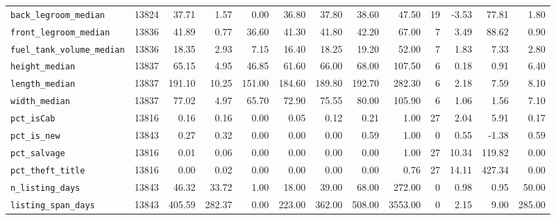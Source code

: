 \begin{table}[htbp]
\begin{tabular}{lrrrrrrrrrrrr}
    \texttt{back\_legroom\_median} & 13824 & 37.71 & 1.57 & 0.00 & 36.80 & 37.80 & 38.60 & 47.50 & 19 & -3.53 & 77.81 & 1.80 \\
    \texttt{front\_legroom\_median} & 13836 & 41.89 & 0.77 & 36.60 & 41.30 & 41.80 & 42.20 & 67.00 & 7 & 3.49 & 88.62 & 0.90 \\
    \texttt{fuel\_tank\_volume\_median} & 13836 & 18.35 & 2.93 & 7.15 & 16.40 & 18.25 & 19.20 & 52.00 & 7 & 1.83 & 7.33 & 2.80 \\
    \texttt{height\_median} & 13837 & 65.15 & 4.95 & 46.85 & 61.60 & 66.00 & 68.00 & 107.50 & 6 & 0.18 & 0.91 & 6.40 \\
    \texttt{length\_median} & 13837 & 191.10 & 10.25 & 151.00 & 184.60 & 189.80 & 192.70 & 282.30 & 6 & 2.18 & 7.59 & 8.10 \\
    \texttt{width\_median} & 13837 & 77.02 & 4.97 & 65.70 & 72.90 & 75.55 & 80.00 & 105.90 & 6 & 1.06 & 1.56 & 7.10 \\
    \texttt{pct\_isCab} & 13816 & 0.16 & 0.16 & 0.00 & 0.05 & 0.12 & 0.21 & 1.00 & 27 & 2.04 & 5.91 & 0.17 \\
    \texttt{pct\_is\_new} & 13843 & 0.27 & 0.32 & 0.00 & 0.00 & 0.00 & 0.59 & 1.00 & 0 & 0.55 & -1.38 & 0.59 \\
    \texttt{pct\_salvage} & 13816 & 0.01 & 0.06 & 0.00 & 0.00 & 0.00 & 0.00 & 1.00 & 27 & 10.34 & 119.82 & 0.00 \\
    \texttt{pct\_theft\_title} & 13816 & 0.00 & 0.02 & 0.00 & 0.00 & 0.00 & 0.00 & 0.76 & 27 & 14.11 & 427.34 & 0.00 \\
    \texttt{n\_listing\_days} & 13843 & 46.32 & 33.72 & 1.00 & 18.00 & 39.00 & 68.00 & 272.00 & 0 & 0.98 & 0.95 & 50.00 \\
    \texttt{listing\_span\_days} & 13843 & 405.59 & 282.37 & 0.00 & 223.00 & 362.00 & 508.00 & 3553.00 & 0 & 2.15 & 9.00 & 285.00 \\
    \bottomrule
  \end{tabular}
\end{table}

